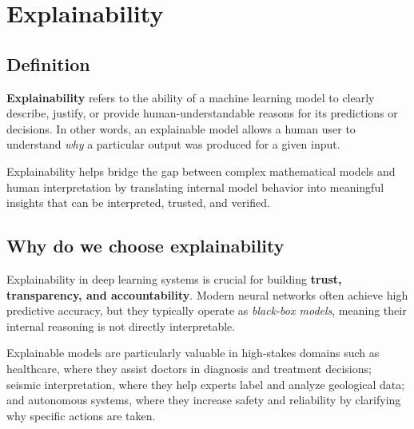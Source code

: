 \documentclass{article}
\begin{document}





\section{Explainability}

\subsection{Definition}
\textbf{Explainability} refers to the ability of a machine learning model to clearly describe, justify, or provide human-understandable reasons for its predictions or decisions. In other words, an explainable model allows a human user to understand \emph{why} a particular output was produced for a given input.

Explainability helps bridge the gap between complex mathematical models and human interpretation by translating internal model behavior into meaningful insights that can be interpreted, trusted, and verified.

\subsection{Why do we choose explainability}
Explainability in deep learning systems is crucial for building \textbf{trust, transparency, and accountability}. Modern neural networks often achieve high predictive accuracy, but they typically operate as \emph{black-box models}, meaning their internal reasoning is not directly interpretable.

Explainable models are particularly valuable in high-stakes domains such as healthcare, where they assist doctors in diagnosis and treatment decisions; seismic interpretation, where they help experts label and analyze geological data; and autonomous systems, where they increase safety and reliability by clarifying why specific actions are taken.
\end{document}
